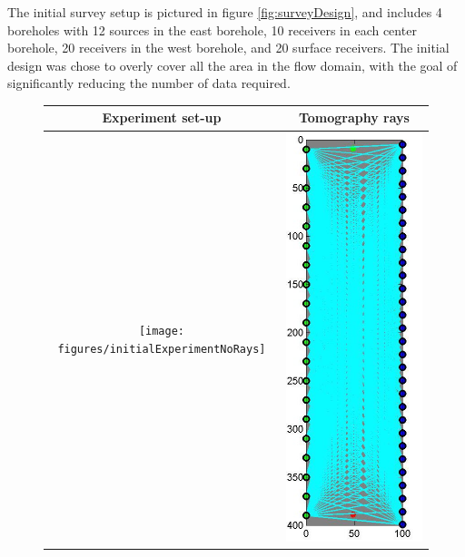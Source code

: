 \documentclass[12pt]{article}
\begin{document}
The initial survey setup is pictured in figure \ref{fig:surveyDesign}, and includes 4 boreholes with 12 sources in the east borehole,  10 receivers in each center borehole,  20 receivers in the west borehole, and 20 surface receivers. The initial design was chose to overly cover all the area in the flow domain, with the goal of significantly reducing the number of data required. 
\begin{figure}[!h]
	\renewcommand{\arraystretch}{1.5}
	\begin{center}
		\iwidth=100mm
		\begin{tabular}{@{}|@{}c@{}|@{}c@{}|@{}} %
			\hline		
			Experiment set-up 
			&
			Tomography rays 			
			\\
			\hline		
			\texttt{[image: figures/initialExperimentNoRays]}
			&
			\includegraphics[width=.8\iwidth]{figures/initialExperiment}

\end{tabular}
\end{center}
\end{figure}
\end{document}
